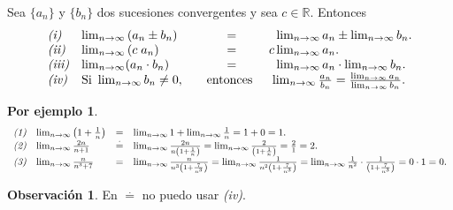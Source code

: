 \documentclass{article}
\theoremstyle{definition}
\theoremstyle{definition}
\newtheorem*{obs}{Observación}
\newtheorem*{ej}{Por ejemplo}
\theoremstyle{remark}
\begin{document}
\begin{teo}
  Sea $\{a_n\}$ y $\{b_n\}$ dos sucesiones convergentes y sea $c \in \mathbb{R}$. Entonces $$\begin{array}{llcl}

    \emph{(i)}      &   \lim_{n\to\infty}{\left(a_n \pm b_n\right)}\;&=&\phantom{c}\lim_{n \to \infty} a_n \pm \lim_{n \to \infty}{b_n}. \\
    \emph{(ii)}     &   \lim_{n \to \infty}{(c\; a_n)}\: \;\;\;\;\;\;&=& c \lim_{n \to \infty}{a_n}. \\
    \emph{(iii)}    &   \lim_{n\to\infty}(a_n\cdot b_n)&=&\phantom{c}\lim_{n\to\infty}a_n\cdot\lim_{n\to\infty}b_n. \\
    \emph{(iv)}     &  \text{Si } \lim_{n \to \infty}{b_n} \neq 0,\quad &\text{entonces   }& \; \lim_{n \to \infty} {\frac{a_n}{b_n}} = \frac{\lim_{n\to\infty}{a_n}}{\lim_{n\to\infty}{b_n}}.

  \end{array}$$
\end{teo}
\begin{ej}
  \[
  \begin{array}{llll}
    \emph{(1)} & \lim_{n\to\infty}{\left(1+\frac{1}{n}\right)} & = & \lim_{n \to \infty}{1} + \lim_{n \to \infty}{\frac{1}{n}}=1+0=1. \\
    \emph{(2)} & \lim_{n\to\infty}{\frac{2n}{n+1}} & \overset{\cdot}{=} & \lim_{n \to \infty}{\frac{2n}{n\left(1+\frac{1}{n}\right)}} = \lim_{n\to \infty}{\frac{2}{\left(1+\frac{1}{n}\right)}} = \frac{2}{1}=2. \\
  \emph{(3)} & \lim_{n\to\infty}{\frac{n}{n^3+7}} & = & \lim_{n \to \infty}{\frac{n}{n^3\left(1+\frac{7}{n^3}\right)}}=\lim_{n\to\infty}{\frac{1}{n^2\left(1+\frac{7}{n^3}\right)}}=\lim_{n \to \infty}{\frac{1}{n^2}\cdot \frac{1}{\left(1+\frac{7}{n^3}\right)}}= 0 \cdot 1 = 0.\\
  \end{array}
\]
\begin{obs}
  En $\overset{\cdot}{=}$ no puedo usar \emph{(iv)}.
\end{obs}
 \end{ej}
\end{document}
